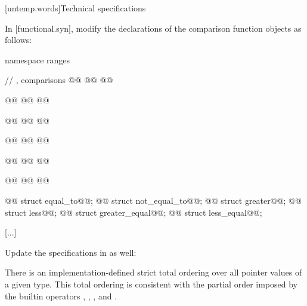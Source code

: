 [untemp.words]{Technical specifications}

In [functional.syn], modify the declarations of the 
comparison function objects as follows:
\begin{codeblock}
  [...]

  namespace ranges {
    // , comparisons
    @@
      @@
    @@

    @@
      @@
    @@

    @@
      @@
    @@

    @@
      @@
    @@

    @@
      @@
    @@

    @@
      @@
    @@

    @@ struct equal_to@@;
    @@ struct not_equal_to@@;
    @@ struct greater@@;
    @@ struct less@@;
    @@ struct greater_equal@@;
    @@ struct less_equal@@;
  }

  [...]
\end{codeblock}

Update the specifications in  as well:

\setcounter{Paras}{1}
\pnum
There is an implementation-defined strict total ordering over all pointer values
of a given type. This total ordering is consistent with the partial order imposed
by the builtin operators \tcode{<}, \tcode{>}, \tcode{<=}, and \tcode{>=}.

